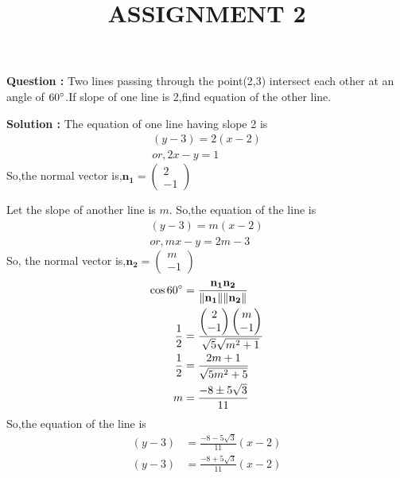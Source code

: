 \documentclass[12pt]{article}
\let\vec\mathbf
\providecommand{\norm}[1]{\ensuremath{\lVert#1\rVert}}
\providecommand{\brak}[1]{\ensuremath{\left(#1\right)}}
\begin{document}
\title{\textbf{ASSIGNMENT 2}}
\date{}
\maketitle
\textbf{Question :} Two lines passing through the point(2,3) intersect each other at an angle of $60\degree$.If slope of one line is 2,find equation of the other line.

\textbf{Solution :} The equation of one line having slope 2 is
\begin{align}
    \brak{y-3}=2\brak{x-2}\\
    or,2x-y=1
\end{align}
So,the normal vector is,$\vec{n_1}=\begin{pmatrix}
    2\\-1
\end{pmatrix}$

Let the slope of another line is $m$.
So,the equation of the line is
\begin{align}
    \brak{y-3}=m\brak{x-2}\\
    or,mx-y=2m-3
\end{align}
So, the normal vector is,$\vec{n_2}=\begin{pmatrix}
    m\\-1
\end{pmatrix}$
\begin{align}
	\cos{60\degree}&=\frac{\vec{n_1n_2}}{\vec{\norm{n_1}\norm{n_2}}}\\
    \frac{1}{2}&=\frac{\begin{pmatrix}
        2\\-1
    \end{pmatrix}\begin{pmatrix}
        m\\-1
    \end{pmatrix}}{\sqrt{5}\sqrt{m^2+1}}\\
    \frac{1}{2}&=\frac{2m+1}{\sqrt{5m^2+5}}\\
    m&=\frac{-8\pm5\sqrt{3}}{11}
\end{align}
So,the equation of the line is
\begin{align}
    \brak{y-3}&=\frac{-8-5\sqrt{3}}{11}\brak{x-2}\\
    \brak{y-3}&=\frac{-8+5\sqrt{3}}{11}\brak{x-2}\\
\end{align}
\end{document}
